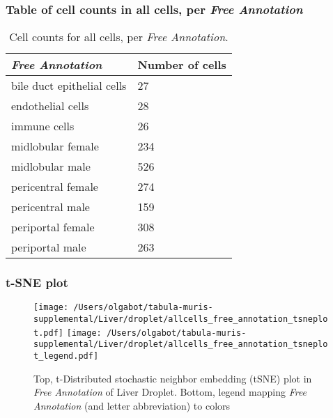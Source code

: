 \subsubsection{Table of cell counts in all cells, per \emph{Free Annotation}}\begin{table}[h]
\centering
\label{my-label}
\begin{tabular}{@{}ll@{}}
\toprule

\emph{Free Annotation}& Number of cells \\ \midrule
bile duct epithelial cells & 27 \\

endothelial cells & 28 \\

immune cells & 26 \\

midlobular female & 234 \\

midlobular male & 526 \\

pericentral female & 274 \\

pericentral male & 159 \\

periportal female & 308 \\

periportal male & 263 \\
\bottomrule
\end{tabular}
\caption{Cell counts for all cells, per \emph{Free Annotation}.}
\end{table}

\clearpage
\subsubsection{t-SNE plot}
\begin{figure}[h]
\centering
\texttt{[image: /Users/olgabot/tabula-muris-supplemental/Liver/droplet/allcells\_free\_annotation\_tsneplot.pdf]}
\texttt{[image: /Users/olgabot/tabula-muris-supplemental/Liver/droplet/allcells\_free\_annotation\_tsneplot\_legend.pdf]}
\caption{Top, t-Distributed stochastic neighbor embedding (tSNE) plot  in \emph{Free Annotation} of Liver Droplet. Bottom, legend mapping \emph{Free Annotation} (and letter abbreviation) to colors}
\end{figure}


\clearpage

